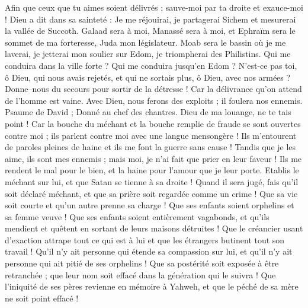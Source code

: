\begin{multicols}{2}
Afin que ceux que tu aimes soient délivrés ; sauve-moi par ta droite et exauce-moi !
Dieu a dit dans sa sainteté : Je me réjouirai, je partagerai Sichem et mesurerai la vallée de Succoth.
Galaad sera à moi, Manassé sera à moi, et Ephraïm sera le sommet de ma forteresse, Juda mon législateur.
Moab sera le bassin où je me laverai, je jetterai mon soulier sur Edom, je triompherai des Philistins. 
Qui me conduira dans la ville forte ? Qui me conduira jusqu'en Edom ?
N'est-ce pas toi, ô Dieu, qui nous avais rejetés, et qui ne sortais plus, ô Dieu, avec nos armées ?
Donne–nous du secours pour sortir de la détresse ! Car la délivrance qu'on attend de l'homme est vaine.
Avec Dieu, nous ferons des exploits ; il foulera nos ennemis.
\VerseOne{}Psaume de David ; Donné au chef des chantres. Dieu de ma louange, ne te tais point !
Car la bouche du méchant et la bouche remplie de fraude se sont ouvertes contre moi ; ils parlent contre moi avec une langue mensongère !
Ils m'entourent de paroles pleines de haine et ils me font la guerre sans cause !
Tandis que je les aime, ils sont mes ennemis ; mais moi, je n'ai fait que prier en leur faveur !
Ils me rendent le mal pour le bien, et la haine pour l'amour que je leur porte.
Etablis le méchant sur lui, et que Satan se tienne à sa droite !
Quand il sera jugé, fais qu'il soit déclaré méchant, et que sa prière soit regardée comme un crime !
Que sa vie soit courte et qu'un autre prenne sa charge !
Que ses enfants soient orphelins et sa femme veuve !
Que ses enfants soient entièrement vagabonds, et qu'ils mendient et quêtent en sortant de leurs maisons détruites !
Que le créancier usant d'exaction attrape tout ce qui est à lui et que les étrangers butinent tout son travail !
Qu'il n'y ait personne qui étende sa compassion sur lui, et qu'il n'y ait personne qui ait pitié de ses orphelins !
Que sa postérité soit exposée à être retranchée ; que leur nom soit effacé dans la génération qui le suivra !
Que l'iniquité de ses pères revienne en mémoire à Yahweh, et que le péché de sa mère ne soit point effacé !

\end{multicols}

